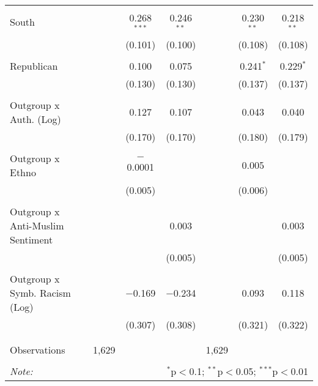 \begin{table}[H]
{\begin{tabular}{@{\extracolsep{5pt}}lcccccc}
  & & & & & & \\ 
 South &  & 0.268$^{***}$ & 0.246$^{**}$ &  & 0.230$^{**}$ & 0.218$^{**}$ \\ 
  &  & (0.101) & (0.100) &  & (0.108) & (0.108) \\ 
  & & & & & & \\ 
 Republican &  & 0.100 & 0.075 &  & 0.241$^{*}$ & 0.229$^{*}$ \\ 
  &  & (0.130) & (0.130) &  & (0.137) & (0.137) \\ 
  & & & & & & \\ 
 Outgroup x Auth. (Log) &  & 0.127 & 0.107 &  & 0.043 & 0.040 \\ 
  &  & (0.170) & (0.170) &  & (0.180) & (0.179) \\ 
  & & & & & & \\ 
 Outgroup x Ethno &  & $-$0.0001 &  &  & 0.005 &  \\ 
  &  & (0.005) &  &  & (0.006) &  \\ 
  & & & & & & \\ 
 Outgroup x Anti-Muslim Sentiment &  &  & 0.003 &  &  & 0.003 \\ 
  &  &  & (0.005) &  &  & (0.005) \\ 
  & & & & & & \\ 
 Outgroup x Symb. Racism (Log) &  & $-$0.169 & $-$0.234 &  & 0.093 & 0.118 \\ 
  &  & (0.307) & (0.308) &  & (0.321) & (0.322) \\ 
  & & & & & & \\ 
\hline \\[-1.8ex] 
Observations & 1,629 &  &  & 1,629 &  &  \\ 
\hline 
\hline \\[-1.8ex] 
\textit{Note:}  & \multicolumn{6}{r}{$^{*}$p$<$0.1; $^{**}$p$<$0.05; $^{***}$p$<$0.01} \\ 
\end{tabular}}
\end{table} 
